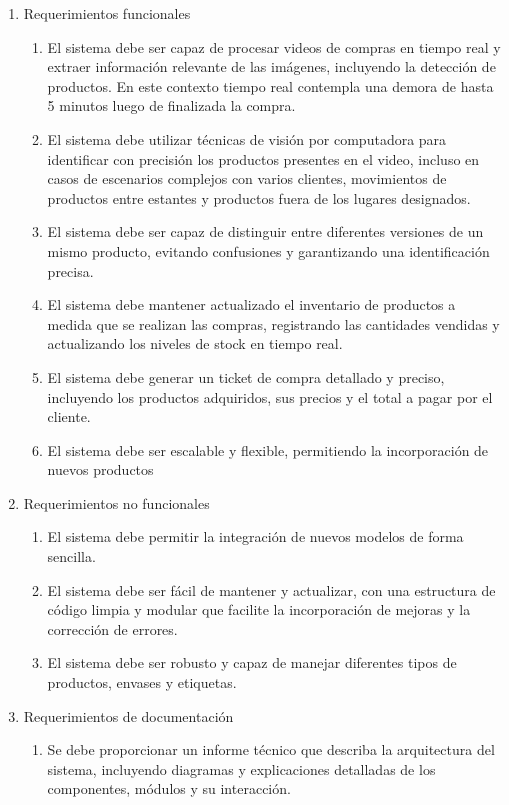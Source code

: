 \documentclass[
11pt, %
]{charter}
\begin{document}
\begin{enumerate}
	\item Requerimientos funcionales
		\begin{enumerate}
			\item El sistema debe ser capaz de procesar videos de compras en tiempo real y extraer información relevante de las imágenes, incluyendo la detección de productos. En este contexto tiempo real contempla una demora de hasta 5 minutos luego de finalizada la compra.
			\item El sistema debe utilizar técnicas de visión por computadora para identificar con precisión los productos presentes en el video, incluso en casos de escenarios complejos con varios clientes, movimientos de productos entre estantes y productos fuera de los lugares designados.
			\item El sistema debe ser capaz de distinguir entre diferentes versiones de un mismo producto, evitando confusiones y garantizando una identificación precisa.
			\item El sistema debe mantener actualizado el inventario de productos a medida que se realizan las compras, registrando las cantidades vendidas y actualizando los niveles de stock en tiempo real.
			\item El sistema debe generar un ticket de compra detallado y preciso, incluyendo los productos adquiridos, sus precios y el total a pagar por el cliente.
			\item El sistema debe ser escalable y flexible, permitiendo la incorporación de nuevos productos
		\end{enumerate}
	\item Requerimientos no funcionales
		\begin{enumerate}
		\item El sistema debe permitir la integración de nuevos modelos de forma sencilla.
			\item El sistema debe ser fácil de mantener y actualizar, con una estructura de código limpia y modular que facilite la incorporación de mejoras y la corrección de errores.
			\item El sistema debe ser robusto y capaz de manejar diferentes tipos de productos, envases y etiquetas.
		\end{enumerate}
		\item Requerimientos de documentación
		\begin{enumerate}
			\item Se debe proporcionar un informe técnico que describa la arquitectura del sistema, incluyendo diagramas y explicaciones detalladas de los componentes, módulos y su interacción.

\end{enumerate}
\end{enumerate}
\end{document}
